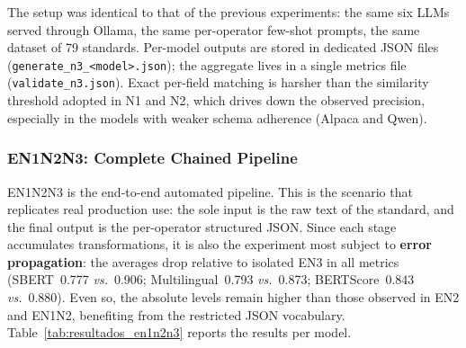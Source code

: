 \documentclass[a4paper,fleqn]{cas-sc}
\begin{document}
The setup was identical to that of the previous experiments: the same six LLMs served through Ollama, the same per-operator few-shot prompts, the same dataset of 79 standards. Per-model outputs are stored in dedicated JSON files (\texttt{generate\_n3\_<model>.json}); the aggregate lives in a single metrics file (\texttt{validate\_n3.json}). Exact per-field matching is harsher than the similarity threshold adopted in N1 and N2, which drives down the observed precision, especially in the models with weaker schema adherence (Alpaca and Qwen).

\subsubsection{EN1N2N3: Complete Chained Pipeline}

EN1N2N3 is the end-to-end automated pipeline. This is the scenario that replicates real production use: the sole input is the raw text of the standard, and the final output is the per-operator structured JSON. Since each stage accumulates transformations, it is also the experiment most subject to \textbf{error propagation}: the averages drop relative to isolated EN3 in all metrics (SBERT~0.777 \textit{vs.}~0.906; Multilingual~0.793 \textit{vs.}~0.873; BERTScore~0.843 \textit{vs.}~0.880). Even so, the absolute levels remain higher than those observed in EN2 and EN1N2, benefiting from the restricted JSON vocabulary. Table~\ref{tab:resultados_en1n2n3} reports the results per model.
\end{document}
